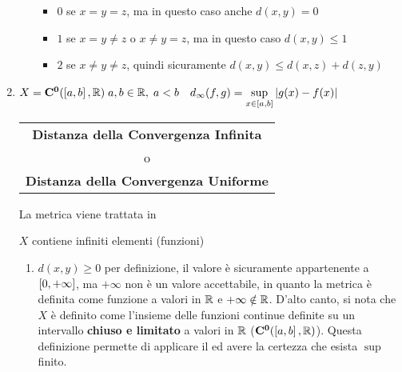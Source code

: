 \begin{example}
\begin{enumerate}
\begin{enumerate}[label=\arabic*.]
					\begin{itemize}
						\item $0$ se $x = y = z$, ma in questo caso anche $d(x,y) = 0$
						\item $1$ se $x = y \neq z$ o $x \neq y = z$, ma in questo caso $d(x,y) \leq 1$
						\item $2$ se $x \neq y \neq z$, quindi sicuramente $d(x,y) \leq d(x,z) + d(z,y)$
					\end{itemize}
			\end{enumerate}
		\item $X=\mathbf{C^{0}}(\left[a,b\right],\mathbb{R})\;a,b\in\mathbb{R},\;a<b \quad d_\infty(f,g) = \sup\limits_{x\in\left[a,b\right]}\left|g(x)-f(x)\right|$ \hfill
			{\footnotesize
				\begin{tabular}{c}
					\textbf{Distanza della Convergenza Infinita}\\[-1ex]
					o\\[-1ex]
					\textbf{Distanza della Convergenza Uniforme}
				\end{tabular}
			}\label{ex:dim_dist_conv_unif}
			\begin{note}
				La metrica viene trattata in 
			\end{note}
			\begin{note}
				$X$ contiene infiniti elementi (funzioni)
			\end{note}
			\begin{center}
			\end{center}
			\begin{enumerate}[label=\arabic*.]
				\item $d(x,y) \geq 0$ per definizione, il valore è sicuramente appartenente a $\left[0,+\infty\right]$, ma $+\infty$ non è un valore accettabile, in quanto la metrica è definita come funzione a valori in $\mathbb{R}$ e $+\infty \notin \mathbb{R}$. D'alto canto, si nota che $X$ è definito come l'insieme delle funzioni continue definite su un intervallo \textbf{chiuso e limitato} a valori in $\mathbb{R}$ ($\mathbf{C^{0}}(\left[a,b\right],\mathbb{R})$). Questa definizione permette di applicare il  ed avere la certezza che esista $\sup$ finito.

\end{enumerate}
\end{enumerate}
\end{example}
